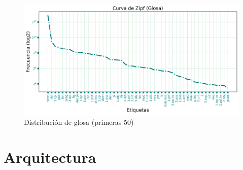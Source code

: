\documentclass[letterpaper,12pt,oneside]{book}
\theoremstyle{definition}
\begin{document}
	
	\begin{figure}

		\centering

		\includegraphics[width=\textwidth]{zipf_gloss}

		\caption{Distribución de glosa (primeras 50)}

	\end{figure}

	

	


	
	\section{Arquitectura}

	












\end{document}

